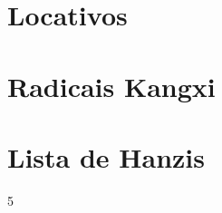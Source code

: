 \documentclass[a4paper,9pt,twoside,openright]{memoir}
\begin{document}
\clearpage
\chapter{Locativos}


\clearpage
\chapter{Radicais Kangxi}


\fi

\clearpage
\chapter{Lista de Hanzis}                                                           
\begin{multicols}{5}
 \begin{KeepFromToc}
  \listoffirsthanzis
 \end{KeepFromToc}
\end{multicols}
\end{document}
